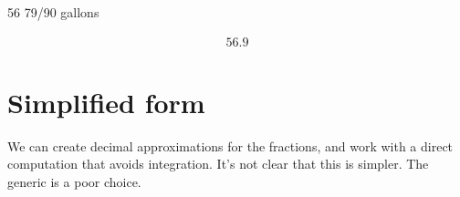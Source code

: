\documentclass[letterpaper,10pt,english]{sphinxmanual}
\begin{document}
\begin{sphinxVerbatim}[commandchars=\\\{\}]
     \PYG{p}{[}\PYG{p}{]}
  
\end{sphinxVerbatim}

\begin{sphinxVerbatim}[commandchars=\\\{\}]
\PYGZsq{}56 79/90 gallons\PYGZsq{}
\end{sphinxVerbatim}

\begin{sphinxVerbatim}[commandchars=\\\{\}]
\end{sphinxVerbatim}
\begin{equation*}
\begin{split}\displaystyle 56.9\end{split}
\end{equation*}

\section{Simplified form}
\label{\detokenize{prism-irregular:simplified-form}}
\sphinxAtStartPar
We can create decimal approximations for the fractions, and work with a direct computation that avoids integration. It’s not clear that this is simpler. The generic  is a poor choice.
\end{document}
